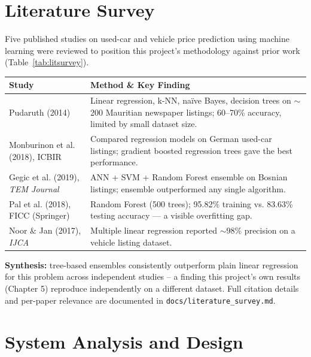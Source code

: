 \documentclass[12pt,a4paper]{report}
\let\oldtable\table
\let\endoldtable\endtable
\renewenvironment{table}[1][H]{\oldtable[#1]\singlespacing}{\endoldtable}
\begin{document}
\chapter{Literature Survey}

Five published studies on used-car and vehicle price prediction using
machine learning were reviewed to position this project's methodology
against prior work (Table~\ref{tab:litsurvey}).

\begin{table}[H]
\centering
\small
\begin{tabularx}{\textwidth}{|l|X|}
\hline
\textbf{Study} & \textbf{Method \& Key Finding} \\
\hline
Pudaruth (2014) &
Linear regression, k-NN, na\"ive Bayes, decision trees on $\sim$200
Mauritian newspaper listings; 60--70\% accuracy, limited by small dataset
size. \\[4pt]
\hline
Monburinon et al. (2018), ICBIR &
Compared regression models on German used-car listings; gradient boosted
regression trees gave the best performance. \\[4pt]
\hline
Gegic et al. (2019), \textit{TEM Journal} &
ANN + SVM + Random Forest ensemble on Bosnian listings; ensemble
outperformed any single algorithm. \\[4pt]
\hline
Pal et al. (2018), FICC (Springer) &
Random Forest (500 trees); 95.82\% training vs. 83.63\% testing accuracy
--- a visible overfitting gap. \\[4pt]
\hline
Noor \& Jan (2017), \textit{IJCA} &
Multiple linear regression reported $\sim$98\% precision on a vehicle
listing dataset. \\
\hline
\end{tabularx}
\caption{Summary of reviewed literature on used-car price prediction.}
\label{tab:litsurvey}
\end{table}

\textbf{Synthesis:} tree-based ensembles consistently outperform plain
linear regression for this problem across independent studies -- a
finding this project's own results (Chapter 5) reproduce independently on
a different dataset. Full citation details and per-paper relevance are
documented in \texttt{docs/literature\_survey.md}.

\chapter{System Analysis and Design}
\end{document}

